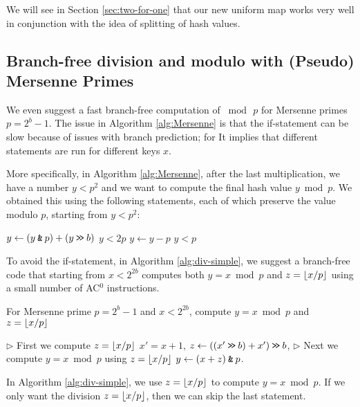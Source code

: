 We will see in Section \ref{sec:two-for-one} that our new uniform map
works very well in conjunction with the idea of splitting of hash values.




\subsection{Branch-free division and modulo with (Pseudo) Mersenne Primes}\label{subsec:intro-division}
%
We even suggest a fast branch-free computation of $\bmod\,p$ for
Mersenne primes $p=2^b-1$. The issue in Algorithm \ref{alg:Mersenne}
is that the if-statement can be slow because of issues with branch
prediction; for It implies that different statements are run for
different keys $x$.

More specifically, in Algorithm \ref{alg:Mersenne}, after the last
multiplication, we have a number $y<p^2$ and we want to compute the
final hash value $y\bmod p$. We obtained this using the following
statements, each of which preserve the value modulo $p$, starting from
$y<p^2$:
\begin{algorithmic}
   \State $y \gets (y\mathbin{\texttt{\&}} p)+(y\mathbin{\texttt{>\!>}} b)$
   \Comment $y<2p$
   \State $y\gets y-p$
   \Comment  $y<p$
   \EndIf
\end{algorithmic}
To avoid the if-statement, in Algorithm \ref{alg:div-simple}, we suggest
a branch-free code that starting
from $x<2^{2b}$ computes both $y=x\bmod p$ and $z=\lfloor {x/p} \rfloor$ using
a small number of AC$^0$ instructions. 
\begin{algorithm}[H]
   \caption{For Mersenne prime $p=2^b-1$ and $x< 2^{2b}$, compute
   \label{alg:div-simple}
   $y=x\bmod p$ and $z=\lfloor {x/p} \rfloor$}
   \begin{algorithmic}
      \State $\rhd$ First we compute $z=\lfloor {x/p} \rfloor$
      \State $x'=x+1$,
      \State $z \gets(( x' \mathbin{\texttt{>\!>}} b)+x')\mathbin{\texttt{>\!>}} b$,
      \State $\rhd$ Next we compute $y=x\bmod p$ using $z=\lfloor {x/p} \rfloor$
      \State $y \gets (x + z) \mathbin{\texttt{\&}} p $.
   \end{algorithmic}
\end{algorithm}
In Algorithm \ref{alg:div-simple}, we use
$z=\lfloor {x/p} \rfloor$ to compute $y=x\bmod p$. If we only want the
division $z=\lfloor {x/p} \rfloor$, then we can skip the last statement.

